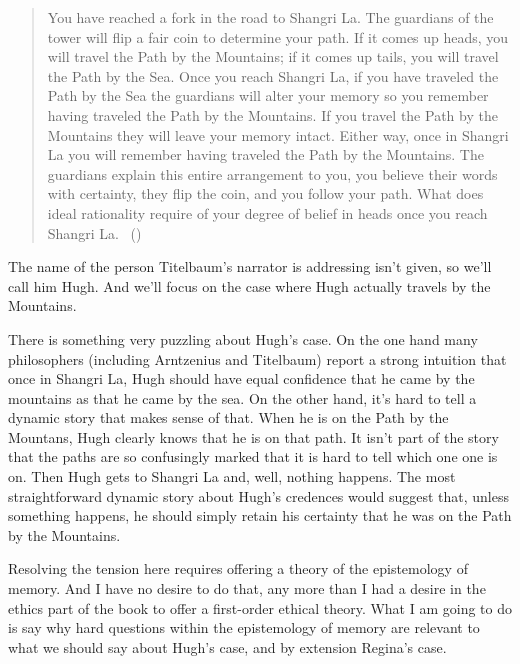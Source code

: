 \documentclass[
  10pt,
  letterpaper,
  twoside]{scrbook}
\begin{document}
\begin{quote}
You have reached a fork in the road to Shangri La. The guardians of the
tower will flip a fair coin to determine your path. If it comes up
heads, you will travel the Path by the Mountains; if it comes up tails,
you will travel the Path by the Sea. Once you reach Shangri La, if you
have traveled the Path by the Sea the guardians will alter your memory
so you remember having traveled the Path by the Mountains. If you travel
the Path by the Mountains they will leave your memory intact. Either
way, once in Shangri La you will remember having traveled the Path by
the Mountains. The guardians explain this entire arrangement to you, you
believe their words with certainty, they flip the coin, and you follow
your path. What does ideal rationality require of your degree of belief
in heads once you reach Shangri La.
~()
\end{quote}

The name of the person Titelbaum's narrator is addressing isn't given,
so we'll call him {Hugh}. And we'll focus on the case where {Hugh}
actually travels by the Mountains.

There is something very puzzling about {Hugh}'s case. On the one hand
many philosophers (including Arntzenius and Titelbaum) report a strong
intuition that once in Shangri La, {Hugh} should have equal confidence
that he came by the mountains as that he came by the sea. On the other
hand, it's hard to tell a dynamic story that makes sense of that. When
he is on the Path by the Mountans, {Hugh} clearly knows that he is on
that path. It isn't part of the story that the paths are so confusingly
marked that it is hard to tell which one one is on. Then {Hugh} gets to
Shangri La and, well, nothing happens. The most straightforward dynamic
story about {Hugh}'s credences would suggest that, unless something
happens, he should simply retain his certainty that he was on the Path
by the Mountains.

Resolving the tension here requires offering a theory of the
epistemology of memory. And I have no desire to do that, any more than I
had a desire in the ethics part of the book to offer a first-order
ethical theory. What I am going to do is say why hard questions within
the epistemology of memory are relevant to what we should say about
{Hugh}'s case, and by extension {Regina}'s case.
\end{document}
